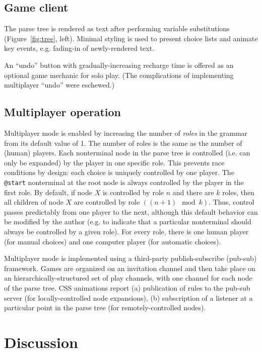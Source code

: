 \documentclass{acm_proc_article-sp}
\begin{document}
\subsection{Game client}

The parse tree is rendered as text after performing variable substitutions (Figure~\ref{fig:tree}, left).
Minimal styling is used to present choice lists and animate key events,
e.g. fading-in of newly-rendered text.

An ``undo'' button with gradually-increasing recharge time is offered as an optional game mechanic for solo play.
(The complications of implementing multiplayer ``undo'' were eschewed.)

\subsection{Multiplayer operation}

Multiplayer mode is enabled by increasing the number of {\em roles} in the grammar from its default value of 1.
The number of roles is the same as the number of (human) players.
Each nonterminal node in the parse tree is controlled (i.e. can only be expanded) by the player in one specific role.
This prevents race conditions by design: each choice is uniquely controlled by one player.
The {\tt @start} nonterminal at the root node is always controlled by the player in the first role.
By default, if node $X$ is controlled by role $n$ and there are $k$ roles,
then all children of node $X$ are controlled by role $((n+1)\mod k)$.
Thus, control passes predictably from one player to the next,
although this default behavior can be modified by the author (e.g. to indicate that a particular nonterminal
should always be controlled by a given role).
For every role, there is one human player (for manual choices)
and one computer player (for automatic choices).

Multiplayer mode is implemented using a third-party publish-subscribe (pub-sub) framework.
Games are organized on an invitation channel and then take place on an hierarchically-structured
set of play channels, with one channel for each node of the parse tree.
CSS animations report
 (a) publication of rules to the pub-sub server (for locally-controlled node expansions),
 (b) subscription of a listener at a particular point in the parse tree (for remotely-controlled nodes).

\section{Discussion}
\end{document}
